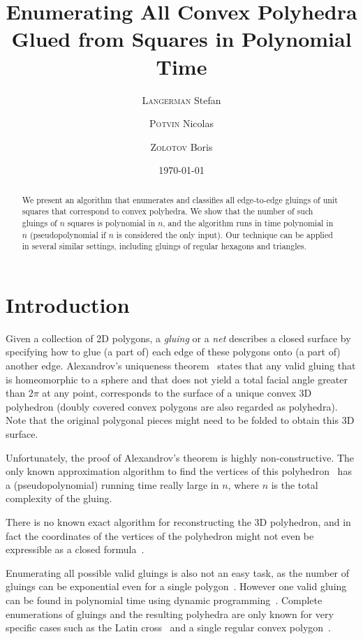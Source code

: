 \documentclass[a4paper,11pt]{article}
\title{Enumerating All Convex Polyhedra Glued from Squares in Polynomial Time}
\author{{\scshape Langerman} Stefan\and {\scshape Potvin} Nicolas \and {\scshape Zolotov} Boris}
\date{\today}
\begin{document}
 \maketitle

\begin{abstract}We present an algorithm that enumerates and classifies all edge-to-edge gluings of unit squares that correspond to convex polyhedra. We show that the number of such gluings of $n$ squares is polynomial in $n$, and the algorithm runs in time polynomial in $n$ (pseudopolynomial if $n$ is considered the only input). Our technique can be applied in several similar settings, including gluings of regular hexagons and triangles.\end{abstract}

\section{Introduction}

Given a collection of 2D polygons, a \emph{gluing} or a \emph{net} describes a closed surface by specifying how to glue (a part of) each edge of these polygons onto (a part of) another edge. Alexandrov's uniqueness theorem~\cite{alex} states that any valid gluing that is homeomorphic to a sphere and that does not yield a total facial angle greater than $2\pi$ at any point, corresponds to the surface of a unique convex 3D polyhedron (doubly covered convex polygons are also regarded as polyhedra). Note that the original polygonal pieces might need to be folded to obtain this 3D surface.

Unfortunately, the proof of Alexandrov's theorem is highly non-constructive. The only known approximation algorithm to find the vertices of this polyhedron~\cite{kpd09-approx} has a (pseudopolynomial) running time really large in $n$, where $n$ is the total complexity of the gluing.

There is no known exact algorithm for reconstructing the 3D polyhedron, and in fact the coordinates of the vertices of the polyhedron might not even be expressible as a closed formula~\cite{bannister2014galois}.

Enumerating all possible valid gluings is also not an easy task, as the number of gluings can be exponential even for a single polygon~\cite{DDLO02}. However one valid gluing can be found in polynomial time using dynamic programming~\cite{DO07,lo96-dynprog}. Complete enumerations of gluings and the resulting polyhedra are only known for very specific cases such as the Latin cross~\cite{ddlop99} and a single regular convex polygon~\cite{DO07}.
\end{document}
